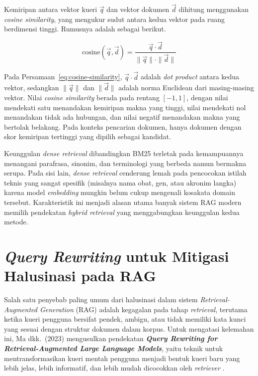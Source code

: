 Kemiripan antara vektor kueri $\vec{q}$ dan vektor dokumen $\vec{d}$ dihitung menggunakan \textit{cosine similarity}, yang mengukur sudut antara kedua vektor pada ruang berdimensi tinggi. Rumusnya adalah sebagai berikut.

\begin{equation}
\label{eq:cosine-similarity}
\text{cosine}(\vec{q}, \vec{d}) = \dfrac{\vec{q} \cdot \vec{d}}{\|\vec{q}\| \cdot \|\vec{d}\|}
\end{equation}

Pada Persamaan~\ref{eq:cosine-similarity}, $\vec{q} \cdot \vec{d}$ adalah \textit{dot product} antara kedua vektor, sedangkan $\|\vec{q}\|$ dan $\|\vec{d}\|$ adalah norma Euclidean dari masing-masing vektor. Nilai \textit{cosine similarity} berada pada rentang $[-1, 1]$, dengan nilai mendekati satu menandakan kemiripan makna yang tinggi, nilai mendekati nol menandakan tidak ada hubungan, dan nilai negatif menandakan makna yang bertolak belakang. Pada konteks pencarian dokumen, hanya dokumen dengan skor kemiripan tertinggi yang dipilih sebagai kandidat.

Keunggulan \textit{dense retrieval} dibandingkan BM25 terletak pada kemampuannya menangani parafrasa, sinonim, dan terminologi yang berbeda namun bermakna serupa. Pada sisi lain, \textit{dense retrieval} cenderung lemah pada pencocokan istilah teknis yang sangat spesifik (misalnya nama obat, gen, atau akronim langka) karena model \textit{embedding} mungkin belum cukup mengenali kosakata domain tersebut. Karakteristik ini menjadi alasan utama banyak sistem RAG modern memilih pendekatan \textit{hybrid retrieval} yang menggabungkan keunggulan kedua metode.


\section{\textit{Query Rewriting} untuk Mitigasi Halusinasi pada RAG}
\label{sec:queryrewriting}

Salah satu penyebab paling umum dari halusinasi dalam sistem \textit{Retrieval-Augmented Generation} (RAG) adalah kegagalan pada tahap \textit{retrieval}, terutama ketika kueri pengguna bersifat pendek, ambigu, atau tidak memiliki kata kunci yang sesuai dengan struktur dokumen dalam korpus. Untuk mengatasi kelemahan ini, Ma dkk.\ (2023) mengusulkan pendekatan \textbf{\textit{Query Rewriting for Retrieval-Augmented Large Language Models}}, yaitu teknik untuk mentransformasikan kueri mentah pengguna menjadi bentuk kueri baru yang lebih jelas, lebih informatif, dan lebih mudah dicocokkan oleh \textit{retriever} \parencite{ma2023queryrewriting}.

